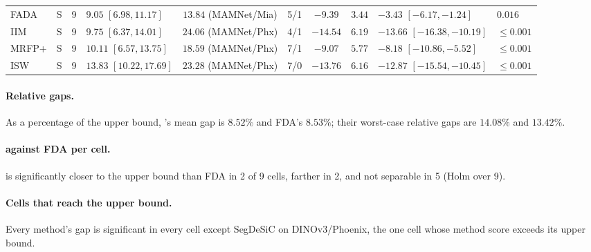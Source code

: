 \begin{table}[h]
{\begin{tabular}{llclccccll}
FADA & S & 9 & $9.05$ $[6.98, 11.17]$ & $13.84$ (MAMNet/Mia) & 5/1 & $-9.39$ & $3.44$ & $-3.43$ $[-6.17, -1.24]$ & $0.016$ \\
IIM & S & 9 & $9.75$ $[6.37, 14.01]$ & $24.06$ (MAMNet/Phx) & 4/1 & $-14.54$ & $6.19$ & $-13.66$ $[-16.38, -10.19]$ & $\le 0.001$ \\
MRFP+ & S & 9 & $10.11$ $[6.57, 13.75]$ & $18.59$ (MAMNet/Phx) & 7/1 & $-9.07$ & $5.77$ & $-8.18$ $[-10.86, -5.52]$ & $\le 0.001$ \\
ISW & S & 9 & $13.83$ $[10.22, 17.69]$ & $23.28$ (MAMNet/Phx) & 7/0 & $-13.76$ & $6.16$ & $-12.87$ $[-15.54, -10.45]$ & $\le 0.001$ \\
\bottomrule
\end{tabular}}
\end{table}

\paragraph{Relative gaps.} As a percentage of the upper bound, \sib{}'s mean gap is
$8.52\%$ and FDA's $8.53\%$; their worst-case relative gaps are $14.08\%$ and $13.42\%$.

\paragraph{\sib{} against FDA per cell.} \sib{} is significantly closer to the upper bound than
FDA in 2 of 9 cells, farther in 2, and not separable in 5 (Holm over 9).

\paragraph{Cells that reach the upper bound.} Every method's gap is significant in every cell
except SegDeSiC on DINOv3/Phoenix, the one cell whose method score exceeds its upper bound.

